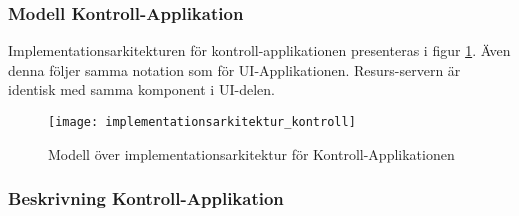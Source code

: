 \subsubsection{Modell Kontroll-Applikation}
Implementationsarkitekturen för kontroll-applikationen presenteras i figur \ref{fig:implementationsarkitektur-kontroll}. Även denna följer samma notation som för UI-Applikationen. Resurs-servern är identisk med samma komponent i UI-delen.

\begin{figure}[h]
    \centering
    \texttt{[image: implementationsarkitektur\_kontroll]}
    \caption{Modell över implementationsarkitektur för Kontroll-Applikationen}
    \label{fig:implementationsarkitektur-kontroll}
\end{figure}

\subsubsection{Beskrivning Kontroll-Applikation}
